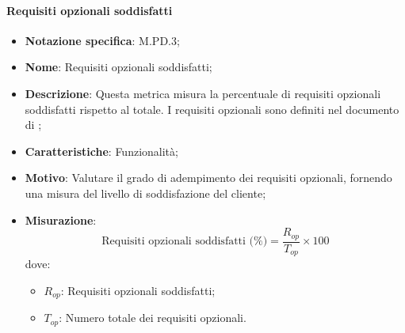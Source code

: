 \paragraph*{Requisiti opzionali soddisfatti}
\begin{itemize}
    \item \textbf{Notazione specifica}: M.PD.3;
    \item \textbf{Nome}: Requisiti opzionali soddisfatti;
    \item \textbf{Descrizione}: Questa metrica misura la percentuale di requisiti opzionali soddisfatti rispetto al totale. I requisiti opzionali sono definiti nel documento di \AnalisiDeiRequisiti;
    \item \textbf{Caratteristiche}: Funzionalità;
    \item \textbf{Motivo}: Valutare il grado di adempimento dei requisiti opzionali, fornendo una misura del livello di soddisfazione del cliente;
    \item \textbf{Misurazione}:
    \[
    \text{Requisiti opzionali soddisfatti (\%)} = \frac{R_{op}}{T_{op}} \times 100
    \]
    dove:
    \begin{itemize}
        \item $R_{op}$: Requisiti opzionali soddisfatti;
        \item $T_{op}$: Numero totale dei requisiti opzionali.
    \end{itemize}
\end{itemize}